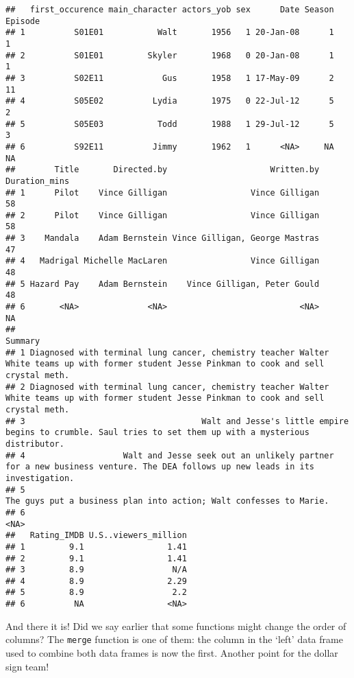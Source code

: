 \documentclass[
]{article}
\begin{document}
\begin{verbatim}
##   first_occurence main_character actors_yob sex      Date Season Episode
## 1          S01E01           Walt       1956   1 20-Jan-08      1       1
## 2          S01E01         Skyler       1968   0 20-Jan-08      1       1
## 3          S02E11            Gus       1958   1 17-May-09      2      11
## 4          S05E02          Lydia       1975   0 22-Jul-12      5       2
## 5          S05E03           Todd       1988   1 29-Jul-12      5       3
## 6          S92E11          Jimmy       1962   1      <NA>     NA      NA
##        Title       Directed.by                     Written.by Duration_mins
## 1      Pilot    Vince Gilligan                 Vince Gilligan            58
## 2      Pilot    Vince Gilligan                 Vince Gilligan            58
## 3    Mandala    Adam Bernstein Vince Gilligan, George Mastras            47
## 4   Madrigal Michelle MacLaren                 Vince Gilligan            48
## 5 Hazard Pay    Adam Bernstein    Vince Gilligan, Peter Gould            48
## 6       <NA>              <NA>                           <NA>            NA
##                                                                                                                                         Summary
## 1 Diagnosed with terminal lung cancer, chemistry teacher Walter White teams up with former student Jesse Pinkman to cook and sell crystal meth.
## 2 Diagnosed with terminal lung cancer, chemistry teacher Walter White teams up with former student Jesse Pinkman to cook and sell crystal meth.
## 3                                    Walt and Jesse's little empire begins to crumble. Saul tries to set them up with a mysterious distributor.
## 4                    Walt and Jesse seek out an unlikely partner for a new business venture. The DEA follows up new leads in its investigation.
## 5                                                                            The guys put a business plan into action; Walt confesses to Marie.
## 6                                                                                                                                          <NA>
##   Rating_IMDB U.S..viewers_million
## 1         9.1                 1.41
## 2         9.1                 1.41
## 3         8.9                  N/A
## 4         8.9                 2.29
## 5         8.9                  2.2
## 6          NA                 <NA>
\end{verbatim}

And there it is! Did we say earlier that some functions might change the
order of columns? The \texttt{merge} function is one of them: the column
in the `left' data frame used to combine both data frames is now the
first. Another point for the dollar sign team!
\end{document}
